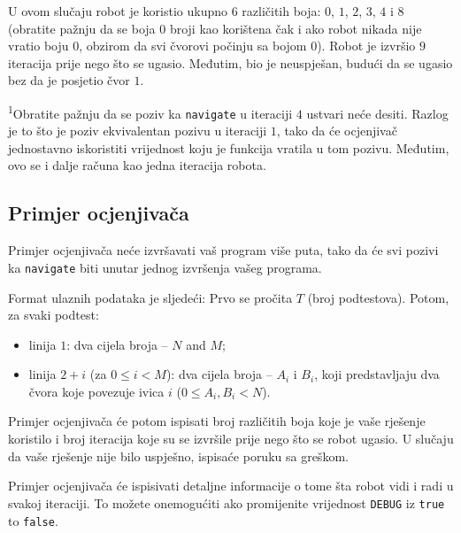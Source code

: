 \documentclass[12pt]{article}
\begin{document}
U ovom slučaju robot je koristio ukupno $6$ različitih boja: $0$, $1$, $2$, $3$, $4$ i $8$ (obratite pažnju da se boja $0$ broji kao korištena čak i ako robot nikada nije vratio boju $0$, obzirom da svi čvorovi počinju sa bojom $0$). Robot je izvršio $9$ iteracija prije nego što se ugasio. Međutim, bio je neuspješan, budući da se ugasio bez da je posjetio čvor $1$.

\textsuperscript{1}Obratite pažnju da se poziv ka \texttt{navigate} u iteraciji $4$ ustvari neće desiti. Razlog je to što je poziv ekvivalentan pozivu u iteraciji $1$, tako da će ocjenjivač jednostavno iskoristiti vrijednost koju je funkcija vratila u tom pozivu. Međutim, ovo se i dalje računa kao jedna iteracija robota.

\subsection{Primjer ocjenjivača}

Primjer ocjenjivača neće izvršavati vaš program više puta, tako da će svi pozivi ka  \texttt{navigate} biti unutar jednog izvršenja vašeg programa.

Format ulaznih podataka je sljedeći: Prvo se pročita $T$ (broj podtestova). Potom, za svaki podtest:
\begin{itemize}
\item linija $1$: dva cijela broja -- $N$ and $M$;
\item linija $2+i$ (za $0 \leq i < M$): dva cijela broja -- $A_i$ i $B_i$, koji predstavljaju dva čvora koje povezuje ivica $i$ ($0 \leq A_i, B_i < N$).
\end{itemize}

Primjer ocjenjivača će potom ispisati broj različitih boja koje je vaše rješenje koristilo i broj iteracija koje su se izvršile prije nego što se robot ugasio. U slučaju da vaše rješenje nije bilo uspješno, ispisaće poruku sa greškom.

Primjer ocjenjivača će ispisivati detaljne informacije o tome šta robot vidi i radi u svakoj iteraciji. To možete onemogućiti ako promijenite vrijednost \texttt{DEBUG} iz \texttt{true} to \texttt{false}.
\end{document}
